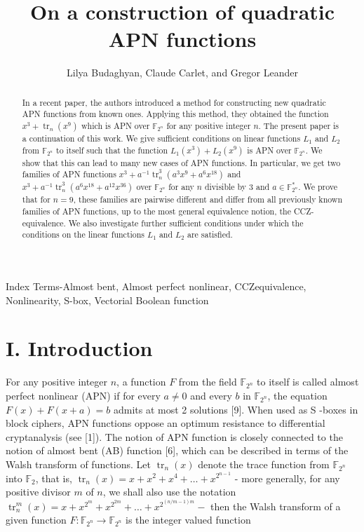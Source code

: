 \documentclass[10pt]{article}
\title{On a construction of quadratic APN functions }
\author{Lilya Budaghyan, Claude Carlet, and Gregor Leander}
\date{}
\begin{document}
\maketitle


\begin{abstract}
In a recent paper, the authors introduced a method for constructing new quadratic APN functions from known ones. Applying this method, they obtained the function $x^{3}+\operatorname{tr}_{n}\left(x^{9}\right)$ which is APN over $\mathbb{F}_{2^{n}}$ for any positive integer $n$. The present paper is a continuation of this work. We give sufficient conditions on linear functions $L_{1}$ and $L_{2}$ from $\mathbb{F}_{2^{n}}$ to itself such that the function $L_{1}\left(x^{3}\right)+L_{2}\left(x^{9}\right)$ is APN over $\mathbb{F}_{2^{n}}$. We show that this can lead to many new cases of APN functions. In particular, we get two families of APN functions $x^{3}+a^{-1} \operatorname{tr}_{n}^{3}\left(a^{3} x^{9}+a^{6} x^{18}\right)$ and $x^{3}+a^{-1} \operatorname{tr}_{n}^{3}\left(a^{6} x^{18}+a^{12} x^{36}\right)$ over $\mathbb{F}_{2^{n}}$ for any $n$ divisible by 3 and $a \in \mathbb{F}_{2^{n}}^{*}$. We prove that for $n=9$, these families are pairwise different and differ from all previously known families of APN functions, up to the most general equivalence notion, the CCZ-equivalence. We also investigate further sufficient conditions under which the conditions on the linear functions $L_{1}$ and $L_{2}$ are satisfied.
\end{abstract}

Index Terms-Almost bent, Almost perfect nonlinear, CCZequivalence, Nonlinearity, S-box, Vectorial Boolean function

\section*{I. Introduction}
For any positive integer $n$, a function $F$ from the field $\mathbb{F}_{2^{n}}$ to itself is called almost perfect nonlinear (APN) if for every $a \neq 0$ and every $b$ in $\mathbb{F}_{2^{n}}$, the equation $F(x)+F(x+a)= b$ admits at most 2 solutions [9]. When used as S -boxes in block ciphers, APN functions oppose an optimum resistance to differential cryptanalysis (see [1]). The notion of APN function is closely connected to the notion of almost bent (AB) function [6], which can be described in terms of the Walsh transform of functions. Let $\operatorname{tr}_{n}(x)$ denote the trace function from $\mathbb{F}_{2^{n}}$ into $\mathbb{F}_{2}$, that is, $\operatorname{tr}_{n}(x)=x+x^{2}+x^{4}+\ldots+x^{2^{n-1}}$ - more generally, for any positive divisor $m$ of $n$, we shall also use the notation $\operatorname{tr}_{n}^{m}(x)=x+x^{2^{m}}+x^{2^{2 m}}+\ldots+x^{2^{(n / m-1) m}}-$ then the Walsh transform of a given function $F: \mathbb{F}_{2^{n}} \rightarrow \mathbb{F}_{2^{n}}$ is the integer valued function
\end{document}

